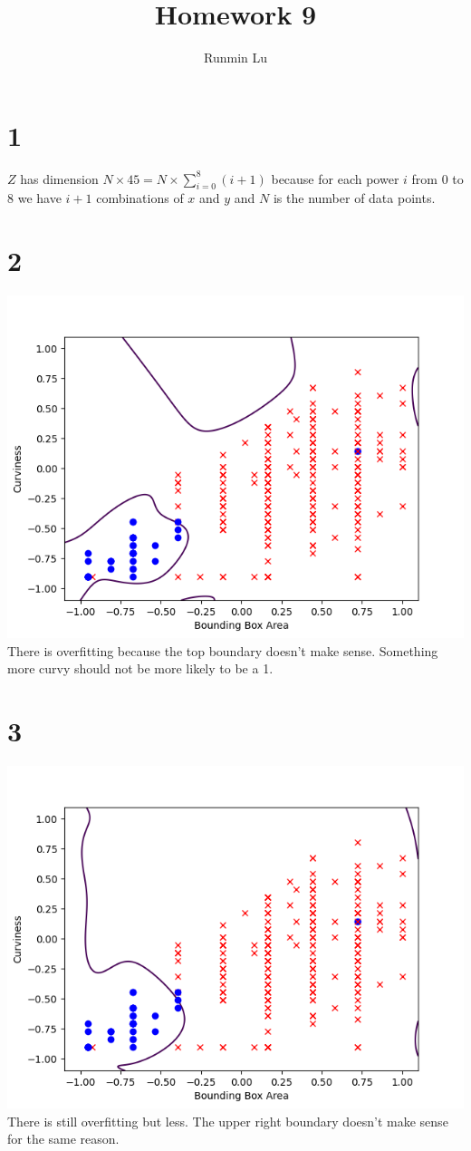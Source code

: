 \documentclass{article}
\title{Homework 9}
\author{Runmin Lu}
\begin{document}
	\maketitle
	
	\section*{1}
		$Z$ has dimension $N \times 45 = N \times \sum\limits_{i=0}^8(i+1)$ because for each power $i$ from 0 to 8 we have $i+1$ combinations of $x$ and $y$ and $N$ is the number of data points.
	
	\section*{2}
		\includegraphics[scale=0.8]{2.png}\\
		There is overfitting because the top boundary doesn't make sense. Something more curvy should not be more likely to be a 1.
	\section*{3}
		\includegraphics[scale=0.8]{3.png}\\
		There is still overfitting but less. The upper right boundary doesn't make sense for the same reason.
\end{document}
